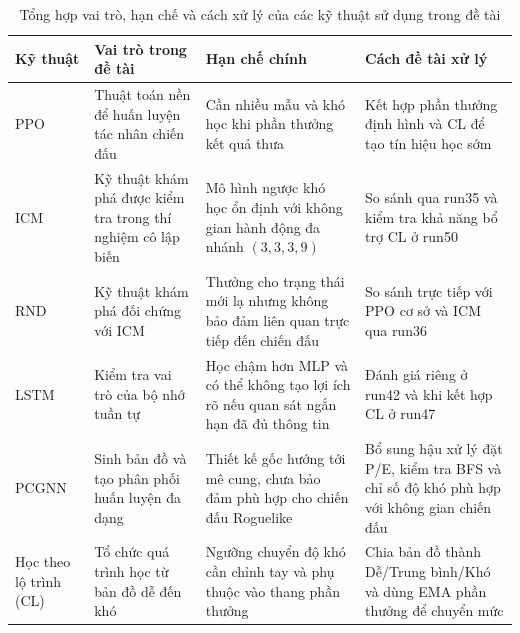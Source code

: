 \begin{table}[H]
    \centering
    \small
    \caption{Tổng hợp vai trò, hạn chế và cách xử lý của các kỹ thuật sử dụng trong đề tài}
    \label{tab:technique_summary}
    \begin{tabular}{|p{2.0cm}|p{3.0cm}|p{4.4cm}|p{4.1cm}|}
        \hline
        \textbf{Kỹ thuật} & \textbf{Vai trò trong đề tài} & \textbf{Hạn chế chính} & \textbf{Cách đề tài xử lý} \\
        \hline
        PPO & Thuật toán nền để huấn luyện tác nhân chiến đấu & Cần nhiều mẫu và khó học khi phần thưởng kết quả thưa & Kết hợp phần thưởng định hình và CL để tạo tín hiệu học sớm \\
        \hline
        ICM & Kỹ thuật khám phá được kiểm tra trong thí nghiệm cô lập biến & Mô hình ngược khó học ổn định với không gian hành động đa nhánh $(3,3,3,9)$ & So sánh qua run35 và kiểm tra khả năng bổ trợ CL ở run50 \\
        \hline
        RND & Kỹ thuật khám phá đối chứng với ICM & Thưởng cho trạng thái mới lạ nhưng không bảo đảm liên quan trực tiếp đến chiến đấu & So sánh trực tiếp với PPO cơ sở và ICM qua run36 \\
        \hline
        LSTM & Kiểm tra vai trò của bộ nhớ tuần tự & Học chậm hơn MLP và có thể không tạo lợi ích rõ nếu quan sát ngắn hạn đã đủ thông tin & Đánh giá riêng ở run42 và khi kết hợp CL ở run47 \\
        \hline
        PCGNN & Sinh bản đồ và tạo phân phối huấn luyện đa dạng & Thiết kế gốc hướng tới mê cung, chưa bảo đảm phù hợp cho chiến đấu Roguelike & Bổ sung hậu xử lý đặt P/E, kiểm tra BFS và chỉ số độ khó phù hợp với không gian chiến đấu \\
        \hline
        Học theo lộ trình (CL) & Tổ chức quá trình học từ bản đồ dễ đến khó & Ngưỡng chuyển độ khó cần chỉnh tay và phụ thuộc vào thang phần thưởng & Chia bản đồ thành Dễ/Trung bình/Khó và dùng EMA phần thưởng để chuyển mức \\
        \hline
    \end{tabular}
\end{table}
